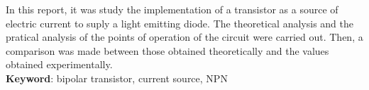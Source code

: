  \setlength{\absparsep}{18pt} %
\begin{resumo}[Abstract]
In this report, it was study the implementation of a transistor as a source of electric current to suply a light emitting diode. The theoretical analysis and the pratical analysis of the points of operation of the circuit were carried out. Then, a comparison was made between those obtained theoretically and the values obtained experimentally. \\
 \noindent
 \textbf{Keyword}: bipolar transistor, current source, NPN
 \end{resumo} 